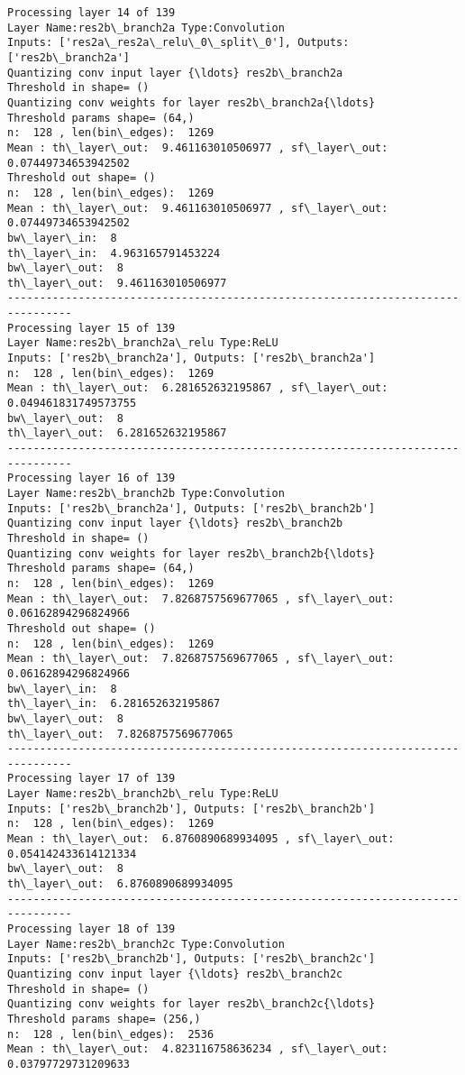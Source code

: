\documentclass[11pt]{article}
\begin{document}
\begin{Verbatim}[commandchars=\\\{\}]
Processing layer 14 of 139
Layer Name:res2b\_branch2a Type:Convolution
Inputs: ['res2a\_res2a\_relu\_0\_split\_0'], Outputs: ['res2b\_branch2a']
Quantizing conv input layer {\ldots} res2b\_branch2a
Threshold in shape= ()
Quantizing conv weights for layer res2b\_branch2a{\ldots}
Threshold params shape= (64,)
n:  128 , len(bin\_edges):  1269
Mean : th\_layer\_out:  9.461163010506977 , sf\_layer\_out:  0.07449734653942502
Threshold out shape= ()
n:  128 , len(bin\_edges):  1269
Mean : th\_layer\_out:  9.461163010506977 , sf\_layer\_out:  0.07449734653942502
bw\_layer\_in:  8
th\_layer\_in:  4.963165791453224
bw\_layer\_out:  8
th\_layer\_out:  9.461163010506977
--------------------------------------------------------------------------------
Processing layer 15 of 139
Layer Name:res2b\_branch2a\_relu Type:ReLU
Inputs: ['res2b\_branch2a'], Outputs: ['res2b\_branch2a']
n:  128 , len(bin\_edges):  1269
Mean : th\_layer\_out:  6.281652632195867 , sf\_layer\_out:  0.049461831749573755
bw\_layer\_out:  8
th\_layer\_out:  6.281652632195867
--------------------------------------------------------------------------------
Processing layer 16 of 139
Layer Name:res2b\_branch2b Type:Convolution
Inputs: ['res2b\_branch2a'], Outputs: ['res2b\_branch2b']
Quantizing conv input layer {\ldots} res2b\_branch2b
Threshold in shape= ()
Quantizing conv weights for layer res2b\_branch2b{\ldots}
Threshold params shape= (64,)
n:  128 , len(bin\_edges):  1269
Mean : th\_layer\_out:  7.8268757569677065 , sf\_layer\_out:  0.06162894296824966
Threshold out shape= ()
n:  128 , len(bin\_edges):  1269
Mean : th\_layer\_out:  7.8268757569677065 , sf\_layer\_out:  0.06162894296824966
bw\_layer\_in:  8
th\_layer\_in:  6.281652632195867
bw\_layer\_out:  8
th\_layer\_out:  7.8268757569677065
--------------------------------------------------------------------------------
Processing layer 17 of 139
Layer Name:res2b\_branch2b\_relu Type:ReLU
Inputs: ['res2b\_branch2b'], Outputs: ['res2b\_branch2b']
n:  128 , len(bin\_edges):  1269
Mean : th\_layer\_out:  6.8760890689934095 , sf\_layer\_out:  0.054142433614121334
bw\_layer\_out:  8
th\_layer\_out:  6.8760890689934095
--------------------------------------------------------------------------------
Processing layer 18 of 139
Layer Name:res2b\_branch2c Type:Convolution
Inputs: ['res2b\_branch2b'], Outputs: ['res2b\_branch2c']
Quantizing conv input layer {\ldots} res2b\_branch2c
Threshold in shape= ()
Quantizing conv weights for layer res2b\_branch2c{\ldots}
Threshold params shape= (256,)
n:  128 , len(bin\_edges):  2536
Mean : th\_layer\_out:  4.823116758636234 , sf\_layer\_out:  0.03797729731209633

\end{Verbatim}
\end{document}
